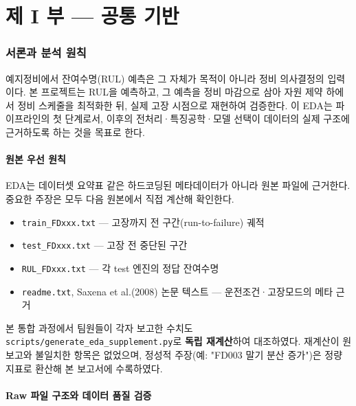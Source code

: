 \documentclass[11pt]{article}
\begin{document}
\tableofcontents
\newpage

\part*{제 I 부 — 공통 기반}

\section{서론과 분석 원칙}

예지정비에서 잔여수명(RUL) 예측은 그 자체가 목적이 아니라 정비 의사결정의 입력이다.
본 프로젝트는 RUL을 예측하고, 그 예측을 정비 마감으로 삼아 자원 제약 하에서 정비 스케줄을 최적화한 뒤, 실제 고장 시점으로 재현하여 검증한다.
이 EDA는 파이프라인의 첫 단계로서, 이후의 전처리·특징공학·모델 선택이 데이터의 실제 구조에 근거하도록 하는 것을 목표로 한다.

\subsection{원본 우선 원칙}

EDA는 데이터셋 요약표 같은 하드코딩된 메타데이터가 아니라 원본 파일에 근거한다.
중요한 주장은 모두 다음 원본에서 직접 계산해 확인한다.
\begin{itemize}[nosep]
  \item \texttt{train\_FDxxx.txt} — 고장까지 전 구간(run-to-failure) 궤적
  \item \texttt{test\_FDxxx.txt} — 고장 전 중단된 구간
  \item \texttt{RUL\_FDxxx.txt} — 각 test 엔진의 정답 잔여수명
  \item \texttt{readme.txt}, Saxena et al.(2008) 논문 텍스트 — 운전조건·고장모드의 메타 근거
\end{itemize}

본 통합 과정에서 팀원들이 각자 보고한 수치도 \texttt{scripts/generate\_eda\_supplement.py}로 \textbf{독립 재계산}하여 대조하였다.
재계산이 원 보고와 불일치한 항목은 없었으며, 정성적 주장(예: "FD003 말기 분산 증가")은 정량 지표로 환산해 본 보고서에 수록하였다.

\subsection{Raw 파일 구조와 데이터 품질 검증}
\end{document}
